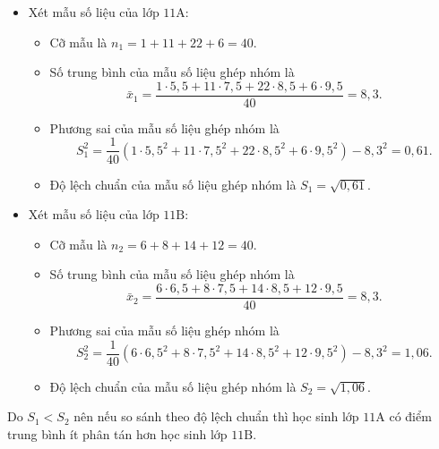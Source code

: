 \begin{vd}
{\begin{enumEX}{1}
\begin{itemize}
				\item Xét mẫu số liệu của lớp $ 11\mathrm{A} $:
				      \begin{itemize}
					      \item Cỡ mẫu là $n_1=1+11+22+6=40$.
					      \item Số trung bình của mẫu số liệu ghép nhóm là
					            $$\bar{x}_1=\dfrac{1 \cdot 5,5+11 \cdot 7,5+22 \cdot 8,5+6 \cdot 9,5}{40}=8,3.$$
					      \item Phương sai của mẫu số liệu ghép nhóm là
					            $$S_1^2=\dfrac{1}{40}\left(1 \cdot 5,5^2+11 \cdot 7,5^2+22 \cdot 8,5^2+6 \cdot 9,5^2\right)-8,3^2=0,61.$$
					      \item Độ lệch chuẩn của mẫu số liệu ghép nhóm là $S_1=\sqrt{0,61}$.
				      \end{itemize}
				\item Xét mẫu số liệu của lớp $ 11\mathrm{B} $:
				      \begin{itemize}
					      \item Cỡ mẫu là $n_2=6+8+14+12=40$.
					      \item Số trung bình của mẫu số liệu ghép nhóm là
					            $$
						            \bar{x}_2=\dfrac{6 \cdot 6,5+8 \cdot 7,5+14 \cdot 8,5+12 \cdot 9,5}{40}=8,3.
					            $$
					      \item Phương sai của mẫu số liệu ghép nhóm là
					            $$
						            S_2^2=\dfrac{1}{40}\left(6 \cdot 6,5^2+8 \cdot 7,5^2+14 \cdot 8,5^2+12 \cdot 9,5^2\right)-8,3^2=1,06.
					            $$
					      \item Độ lệch chuẩn của mẫu số liệu ghép nhóm là $S_2=\sqrt{1,06}$.
				      \end{itemize}
			\end{itemize}
			Do $S_1<S_2$ nên nếu so sánh theo độ lệch chuẩn thì học sinh lớp $11 \mathrm{A}$ có điểm trung bình ít phân tán hơn học sinh lớp $ 11\mathrm{B} $.
		\end{enumEX}
	}
\end{vd}


